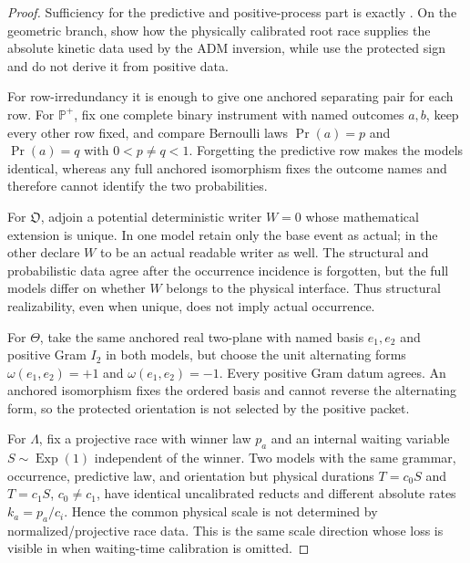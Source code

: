 \documentclass[11pt]{article}
\numberwithin{equation}{section}
\theoremstyle{definition}
\theoremstyle{remark}
\begin{document}
\begin{proof}
Sufficiency for the predictive and positive-process part is exactly
.  On the geometric branch,
 show how the
physically calibrated root race supplies the absolute kinetic data used by the
ADM inversion, while
 use the protected sign and do not derive it from
positive data.

For row-irredundancy it is enough to give one anchored separating pair for each
row.  For $\mathbb P^+$, fix one complete binary instrument with named outcomes
$a,b$, keep every other row fixed, and compare Bernoulli laws
$\Pr(a)=p$ and $\Pr(a)=q$ with $0<p\ne q<1$.  Forgetting the predictive row
makes the models identical, whereas any full anchored isomorphism fixes the
outcome names and therefore cannot identify the two probabilities.

For $\mathfrak O$, adjoin a potential deterministic writer $W=0$ whose
mathematical extension is unique.  In one model retain only the base event as
actual; in the other declare $W$ to be an actual readable writer as well.  The
structural and probabilistic data agree after the occurrence incidence is
forgotten, but the full models differ on whether $W$ belongs to the physical
interface.  Thus structural realizability, even when unique, does not imply
actual occurrence.

For $\Theta$, take the same anchored real two-plane with named basis
$e_1,e_2$ and positive Gram $I_2$ in both models, but choose the unit
alternating forms $\omega(e_1,e_2)=+1$ and
$\omega(e_1,e_2)=-1$.  Every positive Gram datum agrees.  An anchored
isomorphism fixes the ordered basis and cannot reverse the alternating form,
so the protected orientation is not selected by the positive packet.

For $\Lambda$, fix a projective race with winner law $p_a$ and an internal
waiting variable $S\sim\operatorname{Exp}(1)$ independent of the winner.  Two
models with the same grammar, occurrence, predictive law, and orientation but
physical durations $T=c_0S$ and $T=c_1S$, $c_0\ne c_1$, have identical
uncalibrated reducts and different absolute rates $k_a=p_a/c_i$.  Hence the
common physical scale is not determined by normalized/projective race data.
This is the same scale direction whose loss is visible in
 when waiting-time calibration is omitted.


\end{proof}
\end{document}
